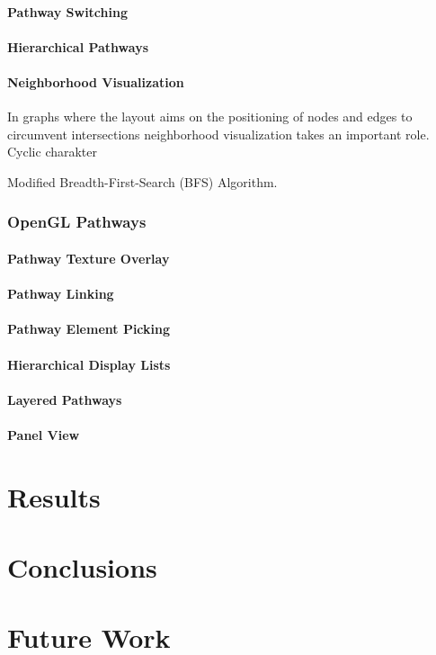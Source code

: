\subsubsection{Pathway Switching}
\subsubsection{Hierarchical Pathways}

\subsubsection{Neighborhood Visualization}


In graphs where the layout aims on the positioning of nodes and edges to circumvent intersections neighborhood visualization takes an important role. 
Cyclic charakter


Modified Breadth-First-Search (BFS) Algorithm.

\subsection{OpenGL Pathways}
\subsubsection{Pathway Texture Overlay}
\subsubsection{Pathway Linking}
\subsubsection{Pathway Element Picking}
\subsubsection{Hierarchical Display Lists}
\subsubsection{Layered Pathways}
\subsubsection{Panel View}

\chapter{Results}


\chapter{Conclusions}

\chapter{Future Work}



